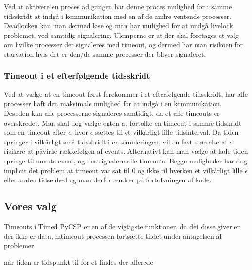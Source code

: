 Ved at aktivere en proces ad gangen har denne proces mulighed for i samme 
tidsskridt at indgå i kommunikation med en af de andre ventende processer. 
Deadlocken kan man dermed løse og man har mulighed for at undgå livelock 
problemet, ved samtidig signalering.
Ulemperne er at der skal foretages et valg om hvilke processer der signaleres 
med  timeout, og dermed har man risikoen for starvation hvis det 
er den/de samme processer der bliver signaleret.

\subsubsection{Timeout i et efterfølgende tidsskridt}
Ved at vælge at en timeout først forekommer i et efterfølgende tidsskridt, har 
alle processer haft den maksimale mulighed for at indgå i en kommunikation. 
Desuden kan alle processerne signaleres samtidigt, da et alle  timeouts er 
overskredet. Man skal dog vælge enten at fortolke en timeout i samme tidskridt  
som en timeout efter $\epsilon$, hvor $\epsilon$ sættes til et vilkårligt 
lille tidsinterval. Da tiden springer i vilkårligt små tidsskridt i  en 
simuleringen, vil en fast størrelse af $\epsilon$ risikere at påvirke 
rækkefølgen af events. Alternativt kan man vælge at lade tiden springe til 
nærste event, og der signalere alle timeouts. Begge muligheder har dog 
implicit det problem at timeout var sat til 0 og ikke til hverken et 
vilkårligt lille $\epsilon$ eller anden tidsenhed og man derfor ændrer på 
fortolkningen af kode.

\subsection{Vores valg} 

Timeouts i Timed PyCSP er en af de vigtigste funktioner, da det disse giver en
der ikke er data, mtimeout processen fortsætte  tildet under antagelsen af 
problemer.

når tiden er  tidspunkt
til for et findes der allerede  
